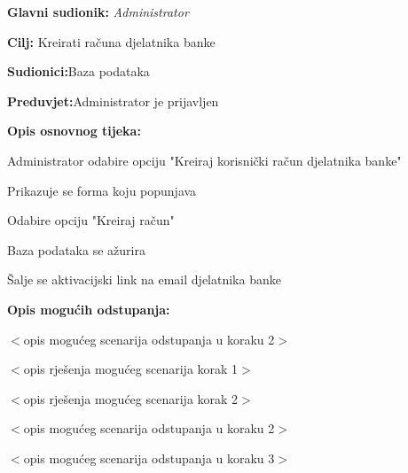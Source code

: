 \noindent {}
\begin{packed_item}
	
	\item \textbf{Glavni sudionik: }\textit{Administrator}
	\item  \textbf{Cilj:} {Kreirati računa djelatnika banke}
	\item  \textbf{Sudionici:}{Baza podataka}
	\item  \textbf{Preduvjet:}{Administrator je prijavljen}
	\item  \textbf{Opis osnovnog tijeka:}
	
	\item[] \begin{packed_enum}
		
		\item {Administrator odabire opciju "Kreiraj korisnički račun djelatnika banke"}
		\item {Prikazuje se forma koju popunjava} 
		\item {Odabire opciju "Kreiraj račun"}
		\item {Baza podataka se ažurira}
		\item {Šalje se aktivacijski link na email djelatnika banke}
	\end{packed_enum}
	
	\item  \textbf{Opis mogućih odstupanja:}
	
	\item[] \begin{packed_item}
		
		\item[2.a] $<$opis mogućeg scenarija odstupanja u koraku 2$>$
		\item[] \begin{packed_enum}
			
			\item $<$opis rješenja mogućeg scenarija korak 1$>$
			\item $<$opis rješenja mogućeg scenarija korak 2$>$
			
		\end{packed_enum}
		\item[2.b] $<$opis mogućeg scenarija odstupanja u koraku 2$>$
		\item[3.a] $<$opis mogućeg scenarija odstupanja  u koraku 3$>$
		
	\end{packed_item}
\end{packed_item}


